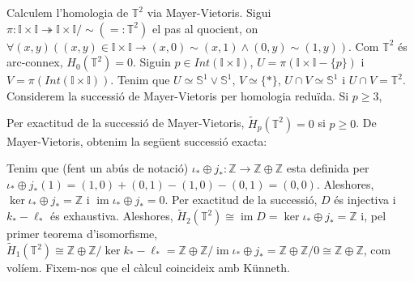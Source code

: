 \documentclass[compress,10pt]{article}
\theoremstyle{definition}
\DeclareMathOperator{\im}{im}
\begin{document}
Calculem l'homologia de $\mathbb{T}^{2}$ via Mayer-Vietoris. Sigui $\pi:\mathbb{I}\times\mathbb{I}\twoheadrightarrow\mathbb{I}\times\mathbb{I}/\sim(=:\mathbb{T}^{2})$ el pas al quocient, on $\forall(x,y)((x,y)\in\mathbb{I}\times\mathbb{I}\rightarrow(x,0)\sim(x,1)\land(0,y)\sim(1,y))$. Com $\mathbb{T}^{2}$ és arc-connex, $H_{0}(\mathbb{T}^{2})=0$. Siguin $p\in Int(\mathbb{I}\times\mathbb{I})$, $U=\pi(\mathbb{I}\times\mathbb{I}-\{p\})$ i $V=\pi(Int(\mathbb{I}\times\mathbb{I}))$. Tenim que $U\simeq\mathbb{S}^{1}\vee\mathbb{S}^{1}$, $V\simeq\{*\}$, $U\cap V\simeq\mathbb{S}^{1}$ i $U\cap V=\mathbb{T}^{2}$. Considerem la successió de Mayer-Vietoris per homologia reduïda. Si $p\geq3$,
\begin{center}
\end{center}
Per exactitud de la successió de Mayer-Vietoris, $\widetilde{H}_{p}(\mathbb{T}^{2})=0$ si $p\geq0$. De Mayer-Vietoris, obtenim la següent successió exacta:
\begin{center}
\end{center}
Tenim que (fent un abús de notació) $\iota_{*}\oplus j_{*}:\mathbb{Z}\rightarrow\mathbb{Z}\oplus\mathbb{Z}$ esta definida per $\iota_{*}\oplus j_{*}(1)=(1,0)+(0,1)-(1,0)-(0,1)=(0,0)$. Aleshores, $\ker{\iota_{*}\oplus j_{*}}=\mathbb{Z}$ i $\im{\iota_{*}\oplus j_{*}}=0$. Per exactitud de la successió, $D$ és injectiva i $k_{*}-\ell_{*}$ és exhaustiva. Aleshores, $\widetilde{H}_{2}(\mathbb{T}^{2})\cong\im{D}=\ker{\iota_{*}\oplus j_{*}}=\mathbb{Z}$ i, pel primer teorema d'isomorfisme, $\widetilde{H}_{1}(\mathbb{T}^{2})\cong\mathbb{Z}\oplus\mathbb{Z}/\ker{k_{*}-\ell_{*}}=\mathbb{Z}\oplus\mathbb{Z}/\im{\iota_{*}\oplus j_{*}}=\mathbb{Z}\oplus\mathbb{Z}/0\cong\mathbb{Z}\oplus\mathbb{Z}$, com volíem. Fixem-nos que el càlcul coincideix amb Künneth.\newline
\end{document}
